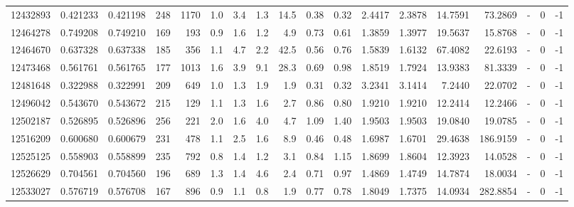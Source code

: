 \begin{tabular}{rrrrrrrrrrrrrrrlrr}
  12432893 & 0.421233 &   0.421198 &  248 & 1170 &      1.0 &      3.4 &     1.3 &     14.5 &       0.38 &        0.32 &  2.4417 &  2.3878 &   14.7591 &   73.2869 &             - &        0 &         -1 \\
  12464278 & 0.749208 &   0.749210 &  169 &  193 &      0.9 &      1.6 &     1.2 &      4.9 &       0.73 &        0.61 &  1.3859 &  1.3977 &   19.5637 &   15.8768 &             - &        0 &         -1 \\
  12464670 & 0.637328 &   0.637338 &  185 &  356 &      1.1 &      4.7 &     2.2 &     42.5 &       0.56 &        0.76 &  1.5839 &  1.6132 &   67.4082 &   22.6193 &             - &        0 &         -1 \\
  12473468 & 0.561761 &   0.561765 &  177 & 1013 &      1.6 &      3.9 &     9.1 &     28.3 &       0.69 &        0.98 &  1.8519 &  1.7924 &   13.9383 &   81.3339 &             - &        0 &         -1 \\
  12481648 & 0.322988 &   0.322991 &  209 &  649 &      1.0 &      1.3 &     1.9 &      1.9 &       0.31 &        0.32 &  3.2341 &  3.1414 &    7.2440 &   22.0702 &             - &        0 &         -1 \\
  12496042 & 0.543670 &   0.543672 &  215 &  129 &      1.1 &      1.3 &     1.6 &      2.7 &       0.86 &        0.80 &  1.9210 &  1.9210 &   12.2414 &   12.2466 &             - &        0 &         -1 \\
  12502187 & 0.526895 &   0.526896 &  256 &  221 &      2.0 &      1.6 &     4.0 &      4.7 &       1.09 &        1.40 &  1.9503 &  1.9503 &   19.0840 &   19.0785 &             - &        0 &         -1 \\
  12516209 & 0.600680 &   0.600679 &  231 &  478 &      1.1 &      2.5 &     1.6 &      8.9 &       0.46 &        0.48 &  1.6987 &  1.6701 &   29.4638 &  186.9159 &             - &        0 &         -1 \\
  12525125 & 0.558903 &   0.558899 &  235 &  792 &      0.8 &      1.4 &     1.2 &      3.1 &       0.84 &        1.15 &  1.8699 &  1.8604 &   12.3923 &   14.0528 &             - &        0 &         -1 \\
  12526629 & 0.704561 &   0.704560 &  196 &  689 &      1.3 &      1.4 &     4.6 &      2.4 &       0.71 &        0.97 &  1.4869 &  1.4749 &   14.7874 &   18.0034 &             - &        0 &         -1 \\
  12533027 & 0.576719 &   0.576708 &  167 &  896 &      0.9 &      1.1 &     0.8 &      1.9 &       0.77 &        0.78 &  1.8049 &  1.7375 &   14.0934 &  282.8854 &             - &        0 &         -1 \\

\end{tabular}
